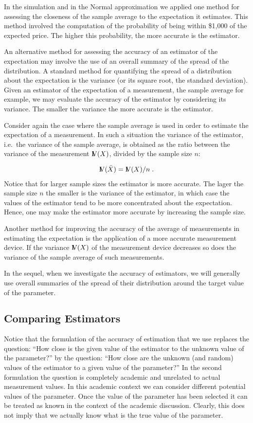 \documentclass[]{krantz}
\newcommand{\Var}{{\rm I\kern-.3em V}}
\theoremstyle{definition}
\theoremstyle{definition}
\theoremstyle{definition}
\theoremstyle{remark}
\begin{document}
In the simulation and in the Normal approximation we applied one method
for assessing the closeness of the sample average to the expectation it
estimates. This method involved the computation of the probability of
being within \$1,000 of the expected price. The higher this probability,
the more accurate is the estimator.

An alternative method for assessing the accuracy of an estimator of the
expectation may involve the use of an overall summary of the spread of
the distribution. A standard method for quantifying the spread of a
distribution about the expectation is the variance (or its square root,
the standard deviation). Given an estimator of the expectation of a
measurement, the sample average for example, we may evaluate the
accuracy of the estimator by considering its variance. The smaller the
variance the more accurate is the estimator.

Consider again the case where the sample average is used in order to
estimate the expectation of a measurement. In such a situation the
variance of the estimator, i.e.~the variance of the sample average, is
obtained as the ratio between the variance of the measurement \(\Var(X)\),
divided by the sample size \(n\):

\[\Var(\bar X) = \Var(X)/n\;.\] Notice
that for larger sample sizes the estimator is more accurate. The lager
the sample size \(n\) the smaller is the variance of the estimator, in
which case the values of the estimator tend to be more concentrated
about the expectation. Hence, one may make the estimator more accurate
by increasing the sample size.

Another method for improving the accuracy of the average of measurements
in estimating the expectation is the application of a more accurate
measurement device. If the variance \(\Var(X)\) of the measurement device
decreases so does the variance of the sample average of such
measurements.

In the sequel, when we investigate the accuracy of estimators, we will
generally use overall summaries of the spread of their distribution
around the target value of the parameter.

\hypertarget{ComparingEstimators}{%
\subsection{Comparing Estimators}\label{ComparingEstimators}}

Notice that the formulation of the accuracy of estimation that we use
replaces the question: ``How close is the given value of the estimator to
the unknown value of the parameter?'' by the question: ``How close are the
unknown (and random) values of the estimator to a given value of the
parameter?'' In the second formulation the question is completely
academic and unrelated to actual measurement values. In this academic
context we can consider different potential values of the parameter.
Once the value of the parameter has been selected it can be treated as
known in the context of the academic discussion. Clearly, this does not
imply that we actually know what is the true value of the parameter.
\end{document}
